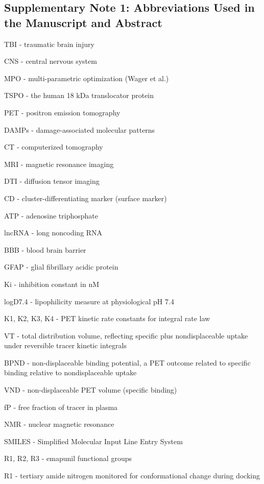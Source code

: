 \documentclass[times, twoside]{zHenriquesLab-StyleBioRxiv}
\begin{document}
		\subsection{Supplementary Note 1: Abbreviations Used in the Manuscript and Abstract}
		
		TBI - traumatic brain injury
		
		CNS - central nervous system
		
		MPO - multi-parametric optimization (Wager et al.)
		
		TSPO - the human 18 kDa translocator protein
		
		PET - positron emission tomography
		
		DAMPs - damage-associated molecular patterns
		
		CT - computerized tomography
		
		MRI - magnetic resonance imaging
		
		DTI - diffusion tensor imaging
		
		CD - cluster-differentiating marker (surface marker)
		
		ATP - adenosine triphosphate
		
		lncRNA - long noncoding RNA
		
		BBB - blood brain barrier
		
		GFAP - glial fibrillary acidic protein
		
		Ki - inhibition constant in nM
		
		logD7.4 - lipophilicity measure at physiological pH 7.4
		
		K1, K2, K3, K4 - PET kinetic rate constants for integral rate law
		
		VT - total distribution volume, reflecting specific plus nondisplaceable uptake under reversible tracer kinetic integrals
		
		BPND - non-displaceable binding potential, a PET outcome related to specific binding relative to nondisplaceable uptake
		
		VND - non-displaceable PET volume (specific binding)
		
		fP - free fraction of tracer in plasma
		
		NMR - nuclear magnetic resonance
		
		SMILES - Simplified Molecular Input Line Entry System
		
		R1, R2, R3 - emapunil functional groups
		
		R1 - tertiary amide nitrogen monitored for conformational change during docking
		
\end{document}
